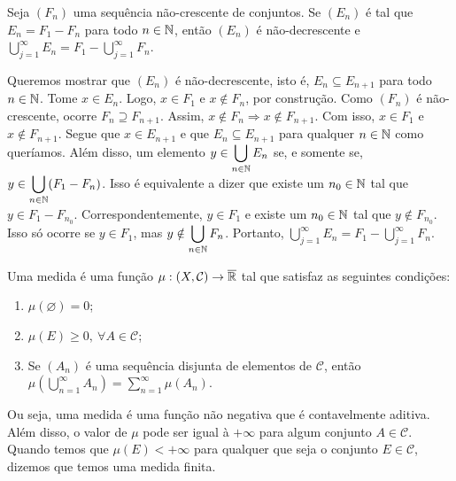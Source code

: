 \begin{proposition}
\label{prop:sequencia-decrescente-conjuntos-resultado-A_n}
Seja $(F_n)$ uma sequência não-crescente de conjuntos. 
Se $(E_n)$ é tal que $E_n = F_1 - F_n$ para todo $n \in \operatorname{\mathbb{N}}$, então $(E_n)$ é não-decrescente e 
$\displaystyle \bigcup_{j = 1}^\infty E_n = \displaystyle F_1 - \bigcup_{j = 1}^\infty F_n$.
\end{proposition}

\begin{prova}
    Queremos mostrar que $(E_n)$ é não-decrescente, isto é, $E_n \subseteq E_{n+1}$ para todo $n \in \operatorname{\mathbb{N}}$.
    Tome $x \in E_n$. Logo, $x \in F_1$ e $x \notin F_n$, por construção.
    Como $(F_n)$ é não-crescente, ocorre $F_{n} \supseteq F_{n+1}$. 
    Assim, $x \notin F_n \Rightarrow x \notin F_{n+1}$.
    Com isso, $x \in F_1$ e $x \notin F_{n+1}$.
    Segue que $x \in E_{n+1}$ e que $E_n \subseteq E_{n+1}$ para qualquer $n \in \operatorname{\mathbb{N}}$ como queríamos.
    Além disso, um elemento $y \in \displaystyle \bigcup_{n \in \operatorname{\mathbb{N}}} E_n$ se, e somente se,
    $y \in \displaystyle \bigcup_{n \in \operatorname{\mathbb{N}}} (F_1 - F_n)$.
    Isso é equivalente a dizer que existe um $n_0 \in \operatorname{\mathbb{N}}$ tal que $y \in F_1 - F_{n_0}$.
    Correspondentemente, $ y \in F_1$ e existe um $n_0 \in \operatorname{\mathbb{N}}$ tal que $y \notin F_{n_0}$.
    Isso só ocorre se $y \in F_1$, mas $y \notin \displaystyle \bigcup_{n \in \operatorname{\mathbb{N}}} F_n$.
    Portanto, $\displaystyle \bigcup_{j = 1}^\infty E_n = \displaystyle F_1 - \bigcup_{j = 1}^\infty F_n$.
\end{prova}

\begin{definition}
\label{def:medida}
    Uma medida é uma função $\mu: (X, \mathcal{C}) \to \operatorname{\overline{\mathbb{R}}}$ tal que satisfaz as seguintes condições:
    \begin{enumerate}[label* = (\roman*)]
        \item $\mu(\varnothing) = 0$;
        \item $\mu(E) \geq 0, \ \forall A \in \mathcal{C}$;
        \item Se $(A_n)$ é uma sequência disjunta de elementos de  $\mathcal{C}$, então 
        $\displaystyle\mu\left(\bigcup_{n = 1}^\infty A_n\right) = \sum_{n = 1}^\infty\mu(A_n)$.
        
    \end{enumerate}
\end{definition}

Ou seja, uma medida é uma função não negativa que é contavelmente aditiva.
Além disso, o valor de $\mu$ pode ser igual à $+\infty$ para algum conjunto $A \in \mathcal{C}$.
Quando temos que $\mu(E) < +\infty$ para qualquer que seja o conjunto $E \in \mathcal{C}$, dizemos que temos uma medida finita.

